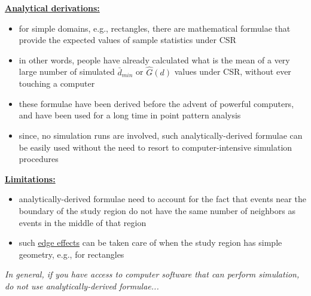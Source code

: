 \documentclass[portrait]{seminar}
\begin{document}
%
%
\begin{slide*}
\begin{center}
 \vspace*{-0.5cm} 
\end{center}


\vspace{0.3cm} \underline{\textbf{Analytical derivations:}}
\begin{itemize}
\item for simple domains, e.g., rectangles, there are mathematical
formulae that provide the expected values of sample statistics under
CSR
\item in other words, people have already calculated what is the
mean of a very large number of simulated $\bar{d}_{min}$ or
$\hat{G}(d)$ values under CSR, without ever touching a computer
\item these formulae have been derived before the advent of powerful
computers, and have been used for a long time in point pattern
analysis
\item since, no simulation runs are involved, such
analytically-derived formulae can be easily used without the need to
resort to computer-intensive simulation procedures
\end{itemize}

\vspace{0.3cm} \underline{\textbf{Limitations:}}
\begin{itemize}
\item analytically-derived formulae need to account for the fact
that events near the boundary of the study region do not have the
same number of neighbors as events in the middle of that region
\item such \underline{edge effects} can be taken care of when
the study region has simple geometry, e.g., for rectangles
\end{itemize}

\vspace{0.2cm}
\begin{center}
\emph{In general, if you have access to computer software that can
perform simulation, do not use analytically-derived formulae...}
\end{center}


\end{slide*}
\end{document}
